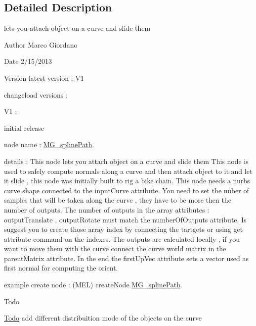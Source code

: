 \subsection{Detailed Description}
lets you attach object on a curve and slide them 

\begin{DoxyAuthor}{Author}
Marco Giordano 
\end{DoxyAuthor}
\begin{DoxyDate}{Date}
2/15/2013 
\end{DoxyDate}
\begin{DoxyVersion}{Version}
latest version \-: V1 

changeload versions \-: \par
 V1 \-: \par

\begin{DoxyItemize}
\item initial release \par

\end{DoxyItemize}
\end{DoxyVersion}
node name \-: \hyperlink{class_m_g__spline_path}{M\-G\-\_\-spline\-Path}.

details \-: This node lets you attach object on a curve and slide them This node is used to safely compute normals along a curve and then attach object to it and let it slide , this node was initially built to rig a bike chain. This node needs a nurbs curve shape connected to the input\-Curve attribute. You need to set the nuber of samples that will be taken along the curve , they have to be more then the number of outputs. The number of outputs in the array attributes \-: output\-Translate , output\-Rotate must match the number\-Of\-Outputs attribute. Is suggest you to create those array index by connecting the tartgets or using get attribute command on the indexes. The outputs are calculated locally , if you want to move them with the curve connect the curve world matrix in the parent\-Matrix attribute. In the end the first\-Up\-Vec attribute sets a vector used as first normal for computing the orient.

example create node \-: (M\-E\-L) create\-Node \hyperlink{class_m_g__spline_path}{M\-G\-\_\-spline\-Path}.

\begin{DoxyRefDesc}{Todo}
\item[\hyperlink{todo__todo000005}{Todo}]add different distribuition mode of the objects on the curve\end{DoxyRefDesc}


